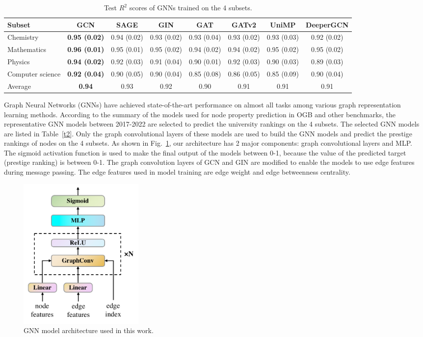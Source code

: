 \documentclass[journal]{IEEEtran}
\begin{document}
\begin{table}[htbp]
\caption{Test $R^2$ scores of GNNs trained on the 4 subsets.}
\begin{center}
\begin{tabular}{lccccccc }
\hline
\textbf{Subset} & \textbf{GCN} & \textbf{SAGE} & \textbf{GIN} & \textbf{GAT} & \textbf{GATv2} & \textbf{UniMP} & \textbf{DeeperGCN}  \\
\hline
Chemistry  &  \textbf{0.95 (0.02)}  &  0.94 (0.02)  &  0.93 (0.02) & 0.93 (0.04) & 0.93 (0.02) & 0.93 (0.03) 
 & 0.92 (0.02) \\
Mathematics  &  \textbf{0.96 (0.01)} & 0.95 (0.01)  &  0.95 (0.02) & 0.94 (0.02) & 0.94 (0.02) & 0.95 (0.02)  
 & 0.95 (0.02) \\
Physics  & \textbf{0.94 (0.02)}  & 0.92 (0.03)  &  0.91 (0.04) & 0.90 (0.01) & 0.92 (0.03) & 0.90 (0.03) & 0.89 (0.03) \\
Computer science  & \textbf{0.92 (0.04)}  & 0.90 (0.05)  &  0.90 (0.04) & 0.85 (0.08) & 0.86 (0.05) & 0.85 (0.09) & 0.90 (0.04) \\
\hline
Average & \textbf{0.94} & 0.93 & 0.92 & 0.90 & 0.91 & 0.91 & 0.91 \\
\hline
\end{tabular}
\label{t3}
\end{center}
\end{table}

Graph Neural Networks (GNNs) have achieved state-of-the-art performance on almost all tasks among various graph representation learning methods. According to the summary of the models used for node property prediction in OGB and other benchmarks, the representative GNN models between 2017-2022 are selected to predict the university rankings on the 4 subsets. The selected GNN models are listed in Table~\ref{t2}. Only the graph convolutional layers of these models are used to build the GNN models and predict the prestige rankings of  nodes on the 4 subsets. As shown in Fig.~\ref{fig3}, our architecture has 2 major components: graph convolutional layers and MLP. The sigmoid activation function is used to make the final output of the models between 0-1, because the value of the predicted target (prestige ranking) is between 0-1. The graph convolution layers of GCN and GIN are modified to enable the models to use edge features during message passing. The edge features used in model training are edge weight and edge betweenness centrality.

\begin{figure}[htbp]
\centerline{\includegraphics[width=0.3\textwidth]{figures/fig3.pdf}}
\caption{GNN model architecture used in this work.}
\label{fig3}
\end{figure}
\end{document}
